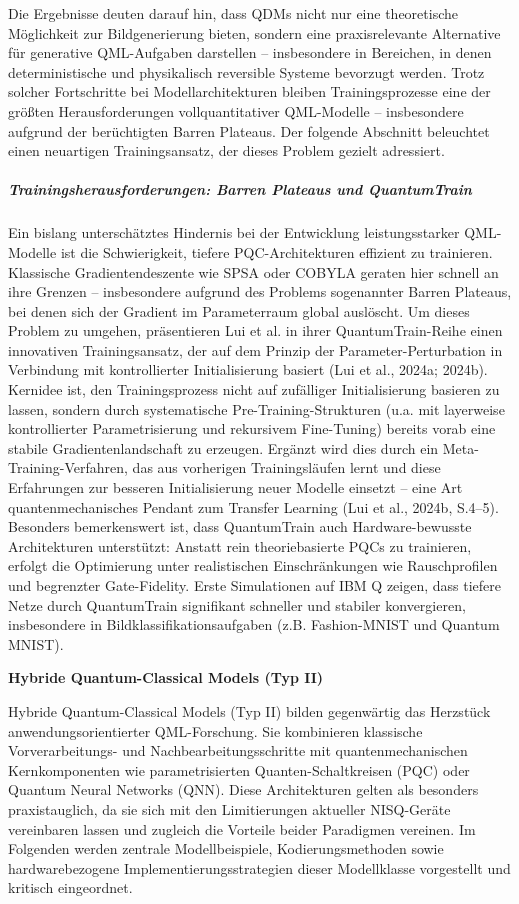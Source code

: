 Die Ergebnisse deuten darauf hin, dass QDMs nicht nur eine theoretische Möglichkeit zur Bildgenerierung bieten, sondern eine praxisrelevante Alternative für generative QML-Aufgaben darstellen – insbesondere in Bereichen, in denen deterministische und physikalisch reversible Systeme bevorzugt werden.
Trotz solcher Fortschritte bei Modellarchitekturen bleiben Trainingsprozesse eine der größten Herausforderungen vollquantitativer QML-Modelle – insbesondere aufgrund der berüchtigten Barren Plateaus. Der folgende Abschnitt beleuchtet einen neuartigen Trainingsansatz, der dieses Problem gezielt adressiert.

\subparagraph{Trainingsherausforderungen: Barren Plateaus und QuantumTrain}
Ein bislang unterschätztes Hindernis bei der Entwicklung leistungsstarker QML-Modelle ist die Schwierigkeit, tiefere PQC-Architekturen effizient zu trainieren. Klassische Gradientendeszente wie SPSA oder COBYLA geraten hier schnell an ihre Grenzen – insbesondere aufgrund des Problems sogenannter Barren Plateaus, bei denen sich der Gradient im Parameterraum global auslöscht. Um dieses Problem zu umgehen, präsentieren Lui et al. in ihrer QuantumTrain-Reihe einen innovativen Trainingsansatz, der auf dem Prinzip der Parameter-Perturbation in Verbindung mit kontrollierter Initialisierung basiert (Lui et al., 2024a; 2024b).
Kernidee ist, den Trainingsprozess nicht auf zufälliger Initialisierung basieren zu lassen, sondern durch systematische Pre-Training-Strukturen (u.a. mit layerweise kontrollierter Parametrisierung und rekursivem Fine-Tuning) bereits vorab eine stabile Gradientenlandschaft zu erzeugen. Ergänzt wird dies durch ein Meta-Training-Verfahren, das aus vorherigen Trainingsläufen lernt und diese Erfahrungen zur besseren Initialisierung neuer Modelle einsetzt – eine Art quantenmechanisches Pendant zum Transfer Learning (Lui et al., 2024b, S.4–5).
Besonders bemerkenswert ist, dass QuantumTrain auch Hardware-bewusste Architekturen unterstützt: Anstatt rein theoriebasierte PQCs zu trainieren, erfolgt die Optimierung unter realistischen Einschränkungen wie Rauschprofilen und begrenzter Gate-Fidelity. Erste Simulationen auf IBM Q zeigen, dass tiefere Netze durch QuantumTrain signifikant schneller und stabiler konvergieren, insbesondere in Bildklassifikationsaufgaben (z.B. Fashion-MNIST und Quantum MNIST).


\vspace{1.5em}
\noindent\textbf{Hybride Quantum-Classical Models (Typ II)}

\noindent
Hybride Quantum-Classical Models (Typ II) bilden gegenwärtig das Herzstück anwendungsorientierter QML-Forschung. Sie kombinieren klassische Vorverarbeitungs- und Nachbearbeitungsschritte mit quantenmechanischen Kernkomponenten wie parametrisierten Quanten-Schaltkreisen (PQC) oder Quantum Neural Networks (QNN). Diese Architekturen gelten als besonders praxistauglich, da sie sich mit den Limitierungen aktueller NISQ-Geräte vereinbaren lassen und zugleich die Vorteile beider Paradigmen vereinen.
Im Folgenden werden zentrale Modellbeispiele, Kodierungsmethoden sowie hardwarebezogene Implementierungsstrategien dieser Modellklasse vorgestellt und kritisch eingeordnet.



